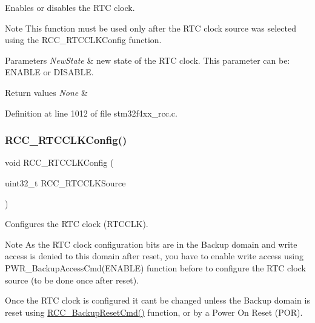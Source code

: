 Enables or disables the R\+TC clock. 

\begin{DoxyNote}{Note}
This function must be used only after the R\+TC clock source was selected using the R\+C\+C\+\_\+\+R\+T\+C\+C\+L\+K\+Config function. 
\end{DoxyNote}

\begin{DoxyParams}{Parameters}
{\em New\+State} & new state of the R\+TC clock. This parameter can be\+: E\+N\+A\+B\+LE or D\+I\+S\+A\+B\+LE. \\
\hline
\end{DoxyParams}

\begin{DoxyRetVals}{Return values}
{\em None} & \\
\hline
\end{DoxyRetVals}


Definition at line 1012 of file stm32f4xx\+\_\+rcc.\+c.

\mbox{\label{group___r_c_c___group3_ga1473d8a5a020642966359611c44181b0}} 
\subsubsection{\texorpdfstring{R\+C\+C\+\_\+\+R\+T\+C\+C\+L\+K\+Config()}{RCC\_RTCCLKConfig()}}
{\footnotesize\ttfamily void R\+C\+C\+\_\+\+R\+T\+C\+C\+L\+K\+Config (\begin{DoxyParamCaption}\item[{uint32\+\_\+t}]{R\+C\+C\+\_\+\+R\+T\+C\+C\+L\+K\+Source }\end{DoxyParamCaption})}



Configures the R\+TC clock (R\+T\+C\+C\+LK). 

\begin{DoxyNote}{Note}
As the R\+TC clock configuration bits are in the Backup domain and write access is denied to this domain after reset, you have to enable write access using P\+W\+R\+\_\+\+Backup\+Access\+Cmd(\+E\+N\+A\+B\+L\+E) function before to configure the R\+TC clock source (to be done once after reset). 

Once the R\+TC clock is configured it can\textquotesingle{}t be changed unless the Backup domain is reset using \hyperlink{group___r_c_c___group3_ga636c3b72f35391e67f12a551b15fa54a}{R\+C\+C\+\_\+\+Backup\+Reset\+Cmd()} function, or by a Power On Reset (P\+OR).
\end{DoxyNote}

